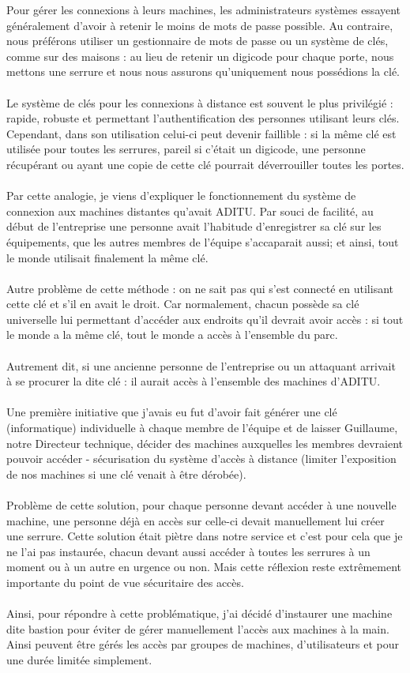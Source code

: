 Pour gérer les connexions à leurs machines, les administrateurs systèmes essayent généralement d'avoir à retenir le moins de mots de passe possible. Au contraire, nous préférons utiliser un gestionnaire de mots de passe ou un système de clés, comme sur des maisons : au lieu de retenir un digicode pour chaque porte, nous mettons une serrure et nous nous assurons qu'uniquement nous possédions la clé.
\\ \\
Le système de clés pour les connexions à distance est souvent le plus privilégié : rapide, robuste et permettant l'authentification des personnes utilisant leurs clés. Cependant, dans son utilisation celui-ci peut devenir faillible : si la même clé est utilisée pour toutes les serrures, pareil si c'était un digicode, une personne récupérant ou ayant une copie de cette clé pourrait déverrouiller toutes les portes.
\\ \\
Par cette analogie, je viens d'expliquer le fonctionnement du système de connexion aux machines distantes qu'avait ADITU. Par souci de facilité, au début de l'entreprise une personne avait l'habitude d'enregistrer sa clé sur les équipements, que les autres membres de l'équipe s'accaparait aussi; et ainsi, tout le monde utilisait finalement la même clé.
\\ \\
Autre problème de cette méthode : on ne sait pas qui s'est connecté en utilisant cette clé et s'il en avait le droit. Car normalement, chacun possède sa clé universelle lui permettant d'accéder aux endroits qu'il devrait avoir accès : si tout le monde a la même clé, tout le monde a accès à l'ensemble du parc.
\\ \\
Autrement dit, si une ancienne personne de l'entreprise ou un attaquant arrivait à se procurer la dite clé : il aurait accès à l'ensemble des machines d'ADITU.
\\ \\
Une première initiative que j'avais eu fut d'avoir fait générer une clé (informatique) individuelle à chaque membre de l'équipe et de laisser Guillaume, notre Directeur technique, décider des machines auxquelles les membres devraient pouvoir accéder - sécurisation du système d'accès à distance (limiter l'exposition de nos machines si une clé venait à être dérobée).
\\ \\
Problème de cette solution, pour chaque personne devant accéder à une nouvelle machine, une personne déjà en accès sur celle-ci devait manuellement lui créer une serrure. Cette solution était piètre dans notre service et c'est pour cela que je ne l'ai pas instaurée, chacun devant aussi accéder à toutes les serrures à un moment ou à un autre en urgence ou non. Mais cette réflexion reste extrêmement importante du point de vue sécuritaire des accès.
\\ \\
Ainsi, pour répondre à cette problématique, j'ai décidé d'instaurer une machine dite bastion pour éviter de gérer manuellement l'accès aux machines à la main. Ainsi peuvent être gérés les accès par groupes de machines, d'utilisateurs et pour une durée limitée simplement. 

